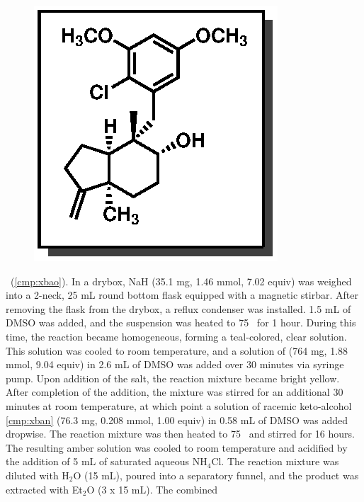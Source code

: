 \vspace{10pt}
\begin{figure}
  \vspace{-25pt}
  \begin{center}
    \includegraphics[scale=0.8]{chp_singlecarbon/images/xbao}
  \end{center}
  \vspace{-30pt}
\end{figure}\noindent \textbf{\CMPxbao}\ (\ref{cmp:xbao}). In a drybox, NaH (35.1 mg, 1.46 mmol,
7.02 equiv) was weighed into a 2-neck, 25 mL round bottom flask equipped with a magnetic stirbar.
After removing the flask from the drybox, a reflux condenser was installed. 1.5 mL of DMSO was
added, and the suspension was heated to 75 \degc\  for 1 hour. During this time, the reaction became
homogeneous, forming a teal-colored, clear solution. This solution was cooled to room temperature,
and a solution of  (764 mg, 1.88 mmol, 9.04 equiv) in 2.6 mL of DMSO was added over 30
minutes via syringe pump. Upon addition of the salt, the reaction mixture became bright yellow.
After completion of the addition, the mixture was stirred for an additional 30 minutes at room
temperature, at which point a solution of racemic keto-alcohol \ref{cmp:xban} (76.3 mg, 0.208 mmol,
1.00 equiv) in 0.58 mL of DMSO was added dropwise. The reaction mixture was then heated to 75 \degc\ 
and stirred for 16 hours. The resulting amber solution was cooled to room temperature and acidified by the addition
of 5 mL of saturated aqueous NH$_4$Cl. The reaction mixture was diluted with H$_2$O (15 mL), poured
into a separatory funnel, and the product was extracted with Et$_2$O (3 x 15 mL). The combined
